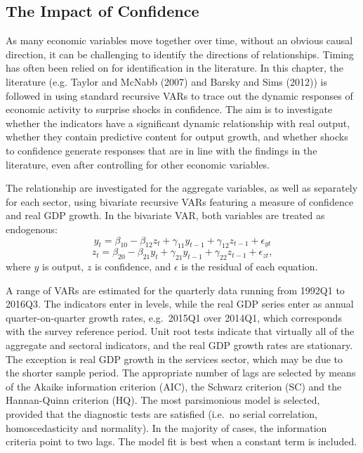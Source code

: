 \documentclass[11pt,]{article}
\begin{document}
\subsection{The Impact of Confidence}\label{the-impact-of-confidence-1}

As many economic variables move together over time, without an obvious
causal direction, it can be challenging to identify the directions of
relationships. Timing has often been relied on for identification in the
literature. In this chapter, the literature (e.g. Taylor and McNabb
(2007) and Barsky and Sims (2012)) is followed in using standard
recursive VARs to trace out the dynamic responses of economic activity
to surprise shocks in confidence. The aim is to investigate whether the
indicators have a significant dynamic relationship with real output,
whether they contain predictive content for output growth, and whether
shocks to confidence generate responses that are in line with the
findings in the literature, even after controlling for other economic
variables.

The relationship are investigated for the aggregate variables, as well
as separately for each sector, using bivariate recursive VARs featuring
a measure of confidence and real GDP growth. In the bivariate VAR, both
variables are treated as endogenous:
\[y_t = \beta_{10} - \beta_{12} z_t + \gamma_{11} y_{t-1} + \gamma_{12} z_{t-1} + \epsilon_{yt}\]
\[z_t = \beta_{20} - \beta_{21} y_t + \gamma_{21} y_{t-1} + \gamma_{22} z_{t-1} + \epsilon_{zt} ,\]
where \(y\) is output, \(z\) is confidence, and \(\epsilon\) is the
residual of each equation.

A range of VARs are estimated for the quarterly data running from 1992Q1
to 2016Q3. The indicators enter in levels, while the real GDP series
enter as annual quarter-on-quarter growth rates, e.g.~2015Q1 over
2014Q1, which corresponds with the survey reference period. Unit root
tests indicate that virtually all of the aggregate and sectoral
indicators, and the real GDP growth rates are stationary. The exception
is real GDP growth in the services sector, which may be due to the
shorter sample period. The appropriate number of lags are selected by
means of the Akaike information criterion (AIC), the Schwarz criterion
(SC) and the Hannan-Quinn criterion (HQ). The most parsimonious model is
selected, provided that the diagnostic tests are satisfied (i.e.~no
serial correlation, homoscedasticity and normality). In the majority of
cases, the information criteria point to two lags. The model fit is best
when a constant term is included.
\end{document}
